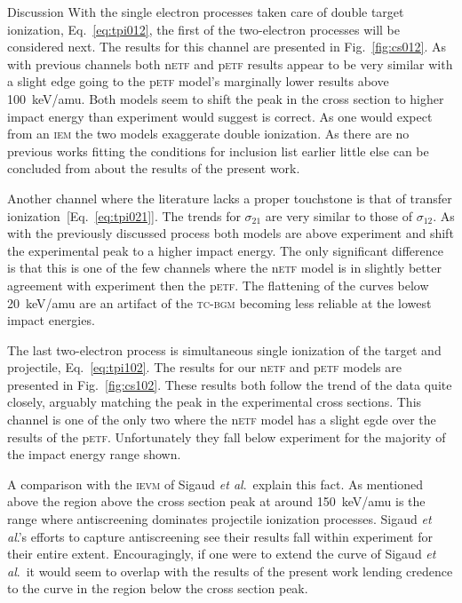 \documentclass[aps, pra, reprint, groupedaddress, amsfonts,
               amsmath, amssymb, showpacs, nofootinbib]{revtex4-1}
\begin{document}
\begin{section}{Discussion \label{sec:disc}}
   With the single electron processes taken care of double target ionization, Eq.~\eqref{eq:tpi012},
   the first of the two-electron processes will be considered next. The results for this channel are
   presented in Fig.~\ref{fig:cs012}. As with previous channels both n\textsc{etf} and p\textsc{etf}
   results appear to be very similar with a slight edge going to the p\textsc{etf} model's marginally
   lower results above 100~keV/amu. Both models seem to shift the peak in the cross section to higher
   impact energy than experiment would suggest is correct. As one would expect from an \textsc{iem}
   the two models exaggerate double ionization. As there are no previous works fitting the conditions
   for inclusion list earlier little else can be concluded from about the results of the present work.

   Another channel where the literature lacks a proper touchstone is that of transfer ionization\
   [Eq.~\eqref{eq:tpi021}]. The trends for $\sigma_{21}$ are very similar to those of $\sigma_{12}$.
   As with the previously discussed process both models are above experiment and shift the experimental
   peak to a higher impact energy. The only significant difference is that this is one of the few
   channels where the n\textsc{etf} model is in slightly better agreement with experiment then the
   p\textsc{etf}. The flattening of the curves below 20~keV/amu are an artifact of the \textsc{tc-bgm}
   becoming less reliable at the lowest impact energies.

   The last two-electron process is simultaneous single ionization of the target and projectile,
   Eq.~\eqref{eq:tpi102}. The results for our n\textsc{etf} and p\textsc{etf} models are presented in
   Fig.~\ref{fig:cs102}. These results both follow the trend of the data quite closely, arguably
   matching the peak in the experimental cross sections. This channel is one of the only two where
   the n\textsc{etf} model has a slight egde over the results of the p\textsc{etf}. Unfortunately they
   fall below experiment for the majority of the impact energy range shown.

   A comparison with the \textsc{ievm} of Sigaud \textit{et al}.\ explain this fact. As mentioned above
   the region above the cross section peak at around 150~keV/amu is the range where antiscreening
   dominates projectile ionization processes. Sigaud \textit{et al}.'s efforts to capture antiscreening
   see their results fall within experiment for their entire extent. Encouragingly, if one were to
   extend the curve of Sigaud \textit{et al}.\ it would seem to overlap with the results of the present
   work lending credence to the curve in the region below the cross section peak.


\end{section}
\end{document}
